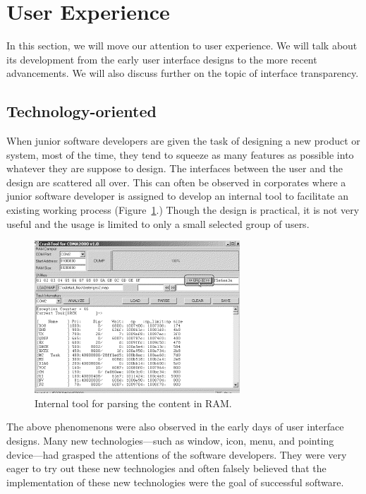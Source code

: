 \documentclass[a4paper,titlepage]{article}
\begin{document}
\section{User Experience}
\label{sec:ux}
In this section, we will move our attention to user experience. We
will talk about its development from the early user interface designs
to the more recent advancements. We will also discuss further on the
topic of interface transparency.

\subsection{Technology-oriented}
When junior software developers are given the task of designing a new
product or system, most of the time, they tend to squeeze as many
features as possible into whatever they are suppose to design. The
interfaces between the user and the design are scattered all
over. This can often be observed in corporates where a junior software
developer is assigned to develop an internal tool to facilitate an
existing working process (Figure~\ref{fig:featureful}.)  Though the
design is practical, it is not very useful and the usage is limited to
only a small selected group of users.

\begin{figure}[!t]
\centering
\includegraphics[width=.7\columnwidth]{featureful}
\caption{Internal tool for parsing the content in RAM.}
\label{fig:featureful}
\end{figure}

The above phenomenons were also observed in the early days of user
interface designs. Many new technologies---such as window, icon, menu,
and pointing device---had grasped the attentions of the software
developers. They were very eager to try out these new technologies and
often falsely believed that the implementation of these new
technologies were the goal of successful software.
\end{document}

